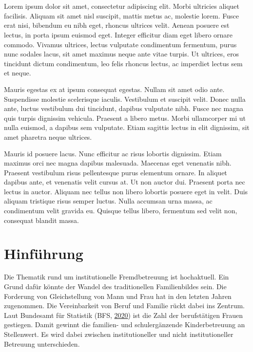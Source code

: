 \documentclass[
  ngerman,
  11pt,
  paper=a4,
  twoside,
  titlepage=true,
  openright,
  abstract=on,
  toc=listofnumbered,
  numbers=noenddot,
  chapterprefix=true,
  headings=optiontohead,
  svgnames,
  dvipsnames]{scrreprt}
\begin{document}
\chapter*{\acknowledgementtitle}
Lorem ipsum dolor sit amet, consectetur adipiscing elit. Morbi ultricies
aliquet facilisis. Aliquam sit amet nisl suscipit, mattis metus ac,
molestie lorem. Fusce erat nisi, bibendum eu nibh eget, rhoncus ultrices
velit. Aenean posuere est lectus, in porta ipsum euismod eget. Integer
efficitur diam eget libero ornare commodo. Vivamus ultrices, lectus
vulputate condimentum fermentum, purus nunc sodales lacus, sit amet
maximus neque ante vitae turpis. Ut ultrices, eros tincidunt dictum
condimentum, leo felis rhoncus lectus, ac imperdiet lectus sem et neque.

Mauris egestas ex at ipsum consequat egestas. Nullam sit amet odio ante.
Suspendisse molestie scelerisque iaculis. Vestibulum et suscipit velit.
Donec nulla ante, luctus vestibulum dui tincidunt, dapibus vulputate
nibh. Fusce nec magna quis turpis dignissim vehicula. Praesent a libero
metus. Morbi ullamcorper mi ut nulla euismod, a dapibus sem vulputate.
Etiam sagittis lectus in elit dignissim, sit amet pharetra neque
ultrices.

Mauris id posuere lacus. Nunc efficitur ac risus lobortis dignissim.
Etiam maximus orci nec magna dapibus malesuada. Maecenas eget venenatis
nibh. Praesent vestibulum risus pellentesque purus elementum ornare. In
aliquet dapibus ante, et venenatis velit cursus at. Ut non auctor dui.
Praesent porta nec lectus in auctor. Aliquam nec tellus non libero
lobortis posuere eget in velit. Duis aliquam tristique risus semper
luctus. Nulla accumsan urna massa, ac condimentum velit gravida eu.
Quisque tellus libero, fermentum sed velit non, consequat blandit massa.
\cleardoublepage%
{
\hypersetup{linkcolor=Black}
\tableofcontents
\cleardoublepage
}
%
\cleardoublepage
{}
\newcommand{\adjustTableFormat}{
\begingroup\singlespacing\fontsize{10pt}{11pt}\selectfont\setlength{\LTpre}{0pt}\setlength{\LTpost}{6pt}
}
\newcommand{\adjustTableFormatEnd}{
\endgroup
}

\hypertarget{sec:hinfuxfchrungzurarbeit}{%
\chapter{Hinführung}\label{sec:hinfuxfchrungzurarbeit}}

Die Thematik rund um institutionelle Fremdbetreuung ist hochaktuell. Ein
Grund dafür könnte der Wandel des traditionellen Familienbildes sein.
Die Forderung von Gleichstellung von Mann und Frau hat in den letzten
Jahren zugenommen. Die Vereinbarkeit von Beruf und Familie rückt dabei
ins Zentrum. Laut Bundesamt für Statistik (BFS,
\protect\hyperlink{ref-bfs}{2020}) ist die Zahl der berufstätigen Frauen
gestiegen. Damit gewinnt die familien- und schulergänzende
Kinderbetreuung an Stellenwert. Es wird dabei zwischen institutioneller
und nicht institutioneller Betreuung unterschieden.
\end{document}

